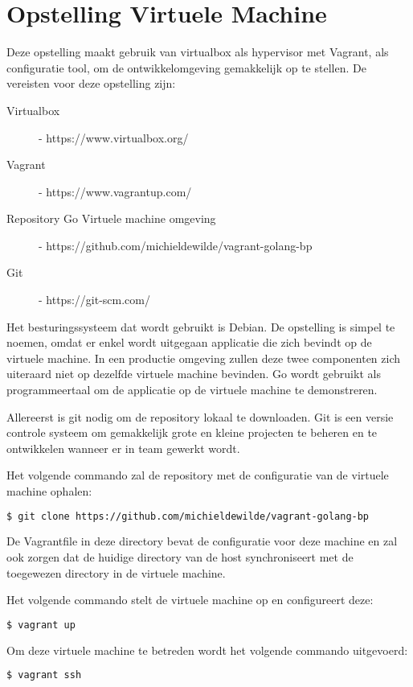 \section{Opstelling Virtuele Machine}

Deze opstelling maakt gebruik van virtualbox als hypervisor met Vagrant, als configuratie tool, om de ontwikkelomgeving gemakkelijk op te stellen. 
De vereisten voor deze opstelling zijn:
\begin{description}
\item [Virtualbox] - https://www.virtualbox.org/
\item [Vagrant] - https://www.vagrantup.com/
\item [Repository Go Virtuele machine omgeving] - https://github.com/michieldewilde/vagrant-golang-bp
\item [Git] - https://git-scm.com/
\end{description}

Het besturingssysteem dat wordt gebruikt is Debian. De opstelling is simpel te noemen, omdat er enkel wordt uitgegaan applicatie die zich bevindt op de virtuele machine. In een productie omgeving zullen deze twee componenten zich uiteraard niet op dezelfde virtuele machine bevinden. Go wordt gebruikt als programmeertaal om de applicatie op de virtuele machine te demonstreren.

Allereerst is git nodig om de repository lokaal te downloaden. Git is een versie controle systeem om gemakkelijk grote en kleine projecten te beheren en te ontwikkelen wanneer er in team gewerkt wordt.

\noindent Het volgende commando zal de repository met de configuratie van de virtuele machine ophalen:
\begin{lstlisting}[language=bash]
  $ git clone https://github.com/michieldewilde/vagrant-golang-bp
\end{lstlisting}

De Vagrantfile in deze directory bevat de configuratie voor deze machine en zal ook zorgen dat de huidige directory van de host synchroniseert met de toegewezen directory in de virtuele machine.

\noindent Het volgende commando stelt de virtuele machine op en configureert deze:
\begin{lstlisting}[language=bash]
  $ vagrant up
\end{lstlisting}

\noindent Om deze virtuele machine te betreden wordt het volgende commando uitgevoerd:
\begin{lstlisting}[language=bash]
  $ vagrant ssh
\end{lstlisting}

